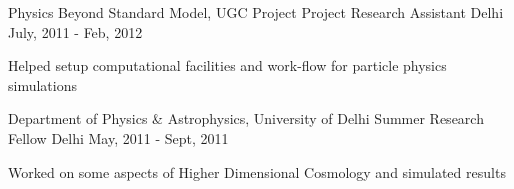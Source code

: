 \begin{cventries}
	
	\cventry
	{Physics Beyond Standard Model, UGC Project} %
	{Project Research Assistant} %
	{Delhi} %
	{July, 2011 - Feb, 2012} %
	{
		\begin{cvitems} 
			\item {Helped setup computational facilities and work-flow for particle physics simulations}
		\end{cvitems}
	}
	
\end{cventries}
\begin{cventries}
	
	\cventry
	{Department of Physics \& Astrophysics, University of Delhi} %
	{Summer Research Fellow} %
	{Delhi} %
	{May, 2011 - Sept, 2011} %
	{
		\begin{cvitems} 
			\item {Worked on some aspects of Higher Dimensional Cosmology and simulated results}
		\end{cvitems}
	}
	
\end{cventries}

